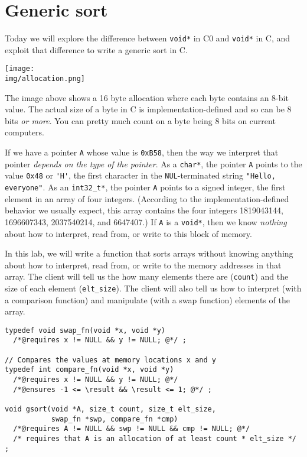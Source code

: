 \section*{Generic sort}

Today we will explore the difference between \lstinline'void*' in C0
and \lstinline'void*' in C, and exploit that difference to write a
generic sort in C.
\begin{center}\vspace{-1ex}
\texttt{[image: \\img/allocation.png]}
\end{center}\vspace{-1ex}
The image above shows a 16 byte allocation where each byte contains an
8-bit value. The actual size of a byte in C is implementation-defined
and so can be 8 bits \emph{or more}.  You can pretty much count on a
byte being 8 bits on current computers.

If we have a pointer \lstinline'A' whose value is \lstinline'0xB58',
then the way we interpret that pointer \emph{depends on the type of
  the pointer}.  As a \lstinline'char*', the pointer \lstinline'A'
points to the value \lstinline'0x48' or \lstinline"'H'", the first
character in the \lstinline'NUL'-terminated string %
\lstinline'"Hello, everyone"'.  %
As an \lstinline'int32_t*', the pointer \lstinline'A'
points to a signed integer, the first element in an array of four
integers. (According to the implementation-defined behavior we usually
expect, this array contains the four integers 1819043144, 1696607343,
2037540214, and 6647407.) If \lstinline'A' is a \lstinline'void*',
then we know \emph{nothing} about how to interpret, read from, or
write to this block of memory.

In this lab, we will write a function that sorts arrays without
knowing anything about how to interpret, read from, or write to the
memory addresses in that array. The client will tell us the how many
elements there are (\lstinline'count') and the size of each element
(\lstinline'elt_size'). The client will also tell us how to interpret
(with a comparison function) and manipulate (with a swap function)
elements of the array.

\enlargethispage{5ex}
\begin{lstlisting}[numbers=none, belowskip=0pt]
typedef void swap_fn(void *x, void *y)
  /*@requires x != NULL && y != NULL; @*/ ;

// Compares the values at memory locations x and y
typedef int compare_fn(void *x, void *y)
  /*@requires x != NULL && y != NULL; @*/
  /*@ensures -1 <= \result && \result <= 1; @*/ ;

void gsort(void *A, size_t count, size_t elt_size,
           swap_fn *swp, compare_fn *cmp)
  /*@requires A != NULL && swp != NULL && cmp != NULL; @*/
  /* requires that A is an allocation of at least count * elt_size */ ;
\end{lstlisting}

